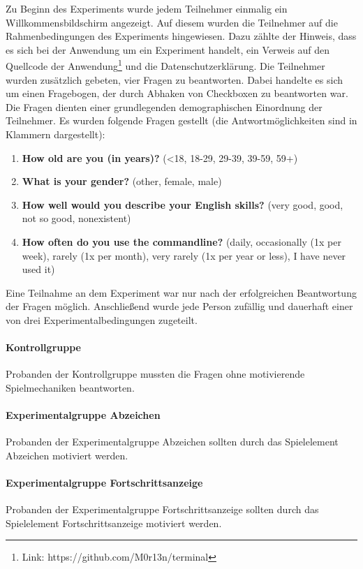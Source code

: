 Zu Beginn des Experiments wurde jedem Teilnehmer einmalig ein Willkommensbildschirm angezeigt. Auf diesem wurden die Teilnehmer auf die Rahmenbedingungen des Experiments hingewiesen. Dazu zählte der Hinweis, dass es sich bei der Anwendung um ein Experiment handelt, ein Verweis auf den Quellcode der Anwendung\footnote{Link: https://github.com/M0r13n/terminal} und die Datenschutzerklärung. Die Teilnehmer wurden zusätzlich gebeten, vier Fragen zu beantworten. Dabei handelte es sich um einen Fragebogen, der durch Abhaken von Checkboxen zu beantworten war. Die Fragen dienten einer grundlegenden demographischen Einordnung der Teilnehmer. Es wurden folgende Fragen gestellt (die Antwortmöglichkeiten sind in Klammern dargestellt):

\begin{enumerate}
	 \item \textbf{How old are you (in years)?} (<18, 18-29, 29-39, 39-59, 59+)
     \item \textbf{What is your gender?} (other, female, male)
     \item \textbf{How well would you describe your English skills?} (very good, good, not so good, nonexistent)
     \item \textbf{How often do you use the commandline?} (daily, occasionally (1x per week), rarely (1x per month), very rarely (1x per year or less), I have never used it)
\end{enumerate}

Eine Teilnahme an dem Experiment war nur nach der erfolgreichen Beantwortung der Fragen möglich. Anschließend wurde jede Person zufällig und dauerhaft einer von drei Experimentalbedingungen  zugeteilt. 

\paragraph{Kontrollgruppe}
Probanden der Kontrollgruppe mussten die Fragen ohne motivierende Spielmechaniken beantworten.

\paragraph{Experimentalgruppe Abzeichen}
Probanden der Experimentalgruppe Abzeichen sollten durch das Spielelement Abzeichen motiviert werden.

\paragraph{Experimentalgruppe Fortschrittsanzeige}
Probanden der Experimentalgruppe Fortschrittsanzeige sollten durch das Spielelement Fortschrittsanzeige motiviert werden.

